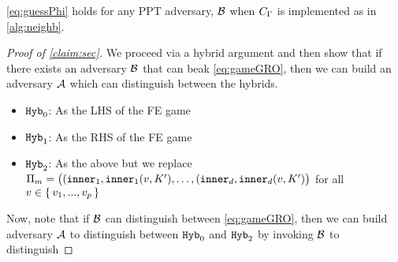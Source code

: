 \begin{claim} 
	\label{claim:sec}
	\cref{eq:guessPhi} holds for any PPT adversary, $\mathcal{B}$ when $C_\Gamma$ is implemented as in \cref{alg:neighb}.
\end{claim}
\begin{proof}[Proof of \cref{claim:sec}]
We proceed via a hybrid argument and then show that if there exists an adversary $\mathcal{B}$ that can beak \cref{eq:gameGRO},
then we can build an adversary $\mathcal{A}$ which can distinguish between the hybrids.

\begin{itemize}
	\item $\texttt{Hyb}_0$: As the LHS of the FE game
	\item $\texttt{Hyb}_1$: As the RHS of the FE game
	\item $\texttt{Hyb}_2$: As the above but we replace $\Pi_m = \big((\texttt{inner}_1, \texttt{inner}_1(v, K'), \dots, (\texttt{inner}_d, \texttt{inner}_d(v, K')\big)$
	for all $v \in \set{v_1, ..., v_p}$
\end{itemize}

Now, note that if $\mathcal{B}$ can distinguish between \cref{eq:gameGRO}, then we can build adversary $\mathcal{A}$ to distinguish between $\texttt{Hyb}_0$ and $\texttt{Hyb}_2$ by invoking $\mathcal{B}$ to distinguish
\end{proof}

